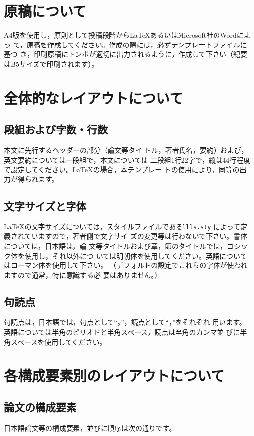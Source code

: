 \documentclass[b5paper,10pt,twocolumn,tombow]{jarticle}
\begin{document}
\section{原稿について}
A4版を使用し，原則として投稿段階から\LaTeX{}あるいはMicrosoft社のWordによっ
て，原稿を作成してください。作成の際には，必ずテンプレートファイルに基づ
き，印刷原稿にトンボが適切に出力されるように，作成して下さい（紀要
はB5サイズで印刷されます）。

\section{全体的なレイアウトについて}
\subsection{段組および字数・行数}

本文に先行するヘッダーの部分（論文等タイ
トル，著者氏名，要約）および，英文要約については一段組で，本文については
二段組1行22字で，縦は44行程度で設定してください。\LaTeX{}の場合，本テンプレー
トの使用により，同等の出力が得られます。


\subsection{文字サイズと字体}
\LaTeX{}の文字サイズについては，スタイルファイルである\texttt{llls.sty}
によって定義されていますので，著者側で文字サイ
ズの変更等は行わないで下さい。書体については，日本語は，論
文等タイトルおよび章，節のタイトルでは，ゴシック体を使用し，それ以外につ
いては明朝体を使用してください。英語についてはローマン体を使用して下さい。
（デフォルトの設定でこれらの字体が使われますので通常，特に意識する必
要はありません。）

\subsection{句読点}
句読点は，日本語では，句点として``。''，読点として``，''をそれぞれ
用います。英語については半角のピリオドと半角スペース，読点は半角のカンマ並
びに半角スペースを使用してください。

\section{各構成要素別のレイアウトについて}

\subsection{論文の構成要素}
日本語論文等の構成要素，並びに順序は次の通りです。
\end{document}
